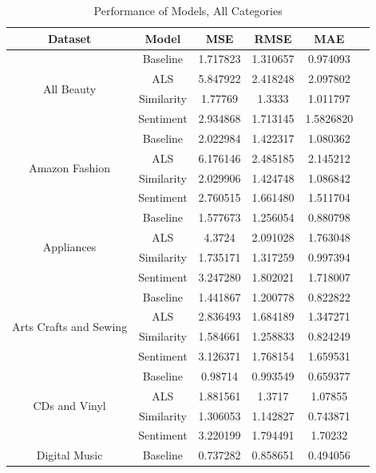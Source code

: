 \documentclass[sigconf,authorversion,nonacm]{acmart}
\begin{document}
    \begin{table}
        \caption{Performance of Models, All Categories}
        \label{tab:perform}
        \begin{tabular}{cccccc}
        
        \toprule
        \textbf{Dataset} & \textbf{Model} & \textbf{MSE} & \textbf{RMSE} & \textbf{MAE} \\ \midrule
        \multirow{4}{*}{All Beauty} & Baseline & 1.717823 & 1.310657 & 0.974093 \\
         & ALS & 5.847922 & 2.418248 & 2.097802 \\
         & Similarity & 1.77769 & 1.3333 & 1.011797 \\
         & Sentiment\footnote[1] & 2.934868 & 1.713145 & 1.5826820 \\ \midrule
        \multirow{4}{*}{Amazon Fashion} & Baseline & 2.022984 & 1.422317 & 1.080362 \\
         & ALS & 6.176146 & 2.485185 & 2.145212 \\
         & Similarity & 2.029906 & 1.424748 & 1.086842 \\
         & Sentiment\footnote[1] & 2.760515 & 1.661480 & 1.511704 \\ \midrule
        \multirow{4}{*}{Appliances} & Baseline & 1.577673 & 1.256054 & 0.880798 \\
         & ALS & 4.3724 & 2.091028 & 1.763048 \\
         & Similarity & 1.735171 & 1.317259 & 0.997394 \\
         & Sentiment\footnote[1] & 3.247280 & 1.802021 & 1.718007 \\ \midrule
        \multirow{4}{*}{Arts Crafts and Sewing} & Baseline & 1.441867 & 1.200778 & 0.822822 \\
         & ALS & 2.836493 & 1.684189 & 1.347271 \\
         & Similarity & 1.584661 & 1.258833 & 0.824249 \\
         & Sentiment\footnote[1] & 3.126371 & 1.768154 & 1.659531 \\ \midrule
        \multirow{4}{*}{CDs and Vinyl} & Baseline & 0.98714 & 0.993549 & 0.659377 \\
         & ALS & 1.881561 & 1.3717 & 1.07855 \\
         & Similarity & 1.306053 & 1.142827 & 0.743871 \\
         & Sentiment\footnote[1]& 3.220199 & 1.794491 & 1.70232 \\ \midrule
        \multirow{4}{*}{Digital Music} & Baseline & 0.737282 & 0.858651 & 0.494056 \\

\end{tabular}
\end{table}
\end{document}
